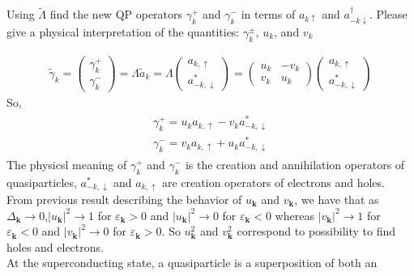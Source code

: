 \documentclass[answers]{exam}
\begin{document}
\begin{questions}
\question Using  $\tilde{\Lambda}$  find the new  QP  operators  $\gamma_{k}^{+}$  and  $\gamma_{k}^{-}$  in terms of  $a_{k \uparrow}$  and  $a_{-k \downarrow}^{\dagger}$.  Please give a physical interpretation of the quantities:  $\gamma_{k}^{\pm}$, $u_{k}$,  and  $v_{k}$ 
\begin{solution}
\begin{align*}
\tilde{\gamma}_{k}=\left(\begin{array}{l}
\gamma _{k}^{+} \\
\gamma_{k}^{-}
\end{array}\right)=\Lambda \tilde a_{k}=\Lambda\left(\begin{array}{c}
a_{k,\uparrow }  \\
a_{-k,\downarrow }^{*}
\end{array}\right)=\left(\begin{array}{cc}
u_{k} & -v_{k} \\
v_{k} & u_{k}
\end{array}\right)\left(\begin{array}{c}
a_{k,\uparrow }  \\
a_{-k,\downarrow }^{*}
\end{array}\right)
\end{align*}
So,
\begin{align*}
\begin{array}{l}
\gamma_{k}^{+}=u_{k}a_{k,\uparrow } -v_{k} a_{-k ,\downarrow }^{*} \\
\gamma _{k}^{-}=v_{k} a_{k,\uparrow }+u_{k} a_{-k,\downarrow } ^{*}
\end{array}
\end{align*}
The physicsl meaning of $\gamma_{k}^{+}$ and $\gamma_{k}^{-}$ is the creation and annihilation operators of quasiparticles, $a_{-k ,\downarrow }^{*}$ and $a_{k,\uparrow }$ are creation operators of electrons and holes.\\
From previous result describing the behavior of  $u_{\mathbf{k}}$  and  $v_{\mathbf{k}}$,  we have that as  $\Delta_{\mathbf{k}} \rightarrow 0$,$\left|u_{\mathbf{k}}\right|^{2} \rightarrow 1$  for  $\varepsilon_{\mathbf{k}}>0$  and  $\left|u_{\mathbf{k}}\right|^{2} \rightarrow 0$  for  $\varepsilon_{\mathbf{k}}<0 $ whereas  $\left|v_{\mathbf{k}}\right|^{2} \rightarrow 1$  for  $\varepsilon_{\mathbf{k}}<0$  and  $\left|v_{\mathbf{k}}\right|^{2} \rightarrow 0$  for  $\varepsilon_{\mathbf{k}}>0$. 
So $u_{\mathbf{k}}^{2}$  and  $v_{\mathbf{k}}^{2}$ correspond to possibility to find holes and electrons.\\
At the superconducting state, a quasiparticle is a superposition of both an

\end{solution}
\end{questions}
\end{document}
